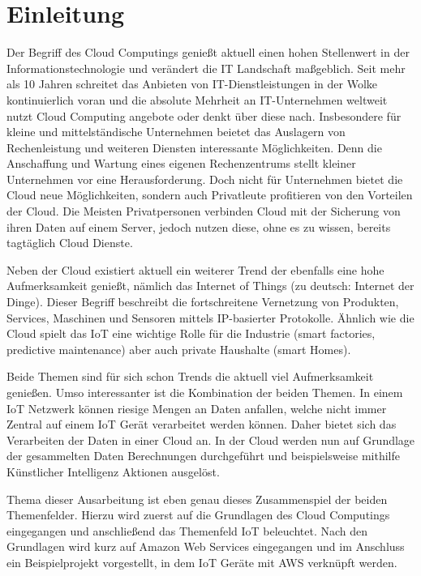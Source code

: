 \chapter{Einleitung}\label{ch:1}

Der Begriff des Cloud Computings genießt aktuell einen hohen Stellenwert in der Informationstechnologie und verändert die IT Landschaft maßgeblich. Seit mehr als 10 Jahren schreitet das Anbieten von IT-Dienstleistungen in der Wolke kontinuierlich voran und die absolute Mehrheit an IT-Unternehmen weltweit nutzt Cloud Computing angebote oder denkt über diese nach\cite*[]{Cloud}. Insbesondere für kleine und mittelständische Unternehmen beietet das Auslagern von Rechenleistung und weiteren Diensten interessante Möglichkeiten. Denn die Anschaffung und Wartung eines eigenen Rechenzentrums stellt kleiner Unternehmen vor eine Herausforderung\cite*[]{DAAS}. Doch nicht für Unternehmen bietet die Cloud neue Möglichkeiten, sondern auch Privatleute profitieren von den Vorteilen der Cloud. Die Meisten Privatpersonen verbinden Cloud mit der Sicherung von ihren Daten auf einem Server, jedoch nutzen diese, ohne es zu wissen, bereits tagtäglich Cloud Dienste.%

Neben der Cloud existiert aktuell ein weiterer Trend der ebenfalls eine hohe Aufmerksamkeit genießt, nämlich das Internet of Things (zu deutsch: Internet der Dinge). Dieser Begriff beschreibt die fortschreitene Vernetzung von Produkten, Services, Maschinen und Sensoren mittels IP-basierter Protokolle. Ähnlich wie die Cloud spielt das IoT eine wichtige Rolle für die Industrie (smart factories, predictive maintenance) aber auch private Haushalte (smart Homes)\cite*[]{Next}\cite*[]{Öster}. 

Beide Themen sind für sich schon Trends die aktuell viel Aufmerksamkeit genießen. Umso interessanter ist die Kombination der beiden Themen. In einem IoT Netzwerk können riesige Mengen an Daten anfallen, welche nicht immer Zentral auf einem IoT Gerät verarbeitet werden können. Daher bietet sich das Verarbeiten der Daten in einer Cloud an. In der Cloud werden nun auf Grundlage der gesammelten Daten Berechnungen durchgeführt und beispielsweise mithilfe Künstlicher Intelligenz Aktionen ausgelöst. 

Thema dieser Ausarbeitung ist eben genau dieses Zusammenspiel der beiden Themenfelder. Hierzu wird zuerst auf die Grundlagen des Cloud Computings eingegangen und anschließend das Themenfeld IoT beleuchtet. Nach den Grundlagen wird kurz auf Amazon Web Services eingegangen und im Anschluss ein Beispielprojekt vorgestellt, in dem IoT Geräte mit AWS verknüpft werden.  
